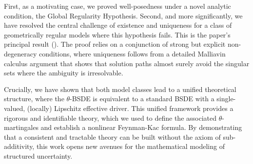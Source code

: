 \documentclass[12pt, letterpaper]{amsart}
\theoremstyle{plain}
\theoremstyle{definition}
\theoremstyle{remark}
\numberwithin{equation}{section} %
\begin{document}
First, as a motivating case, we proved well-posedness under a novel analytic condition, the Global Regularity Hypothesis. Second, and more significantly, we have resolved the central challenge of existence and uniqueness for a class of geometrically regular models where this hypothesis fails. This is the paper's principal result (). The proof relies on a conjunction of strong but explicit non-degeneracy conditions, where uniqueness follows from a detailed Malliavin calculus argument that shows that solution paths almost surely avoid the singular sets where the ambiguity is irresolvable.

Crucially, we have shown that both model classes lead to a unified theoretical structure, where the \(\theta\)-BSDE is equivalent to a standard BSDE with a single-valued, (locally) Lipschitz effective driver. This unified framework provides a rigorous and identifiable theory, which we used to define the associated $\theta$-martingales and establish a nonlinear Feynman-Kac formula. By demonstrating that a consistent and tractable theory can be built without the axiom of sub-additivity, this work opens new avenues for the mathematical modeling of structured uncertainty.
\end{document}
